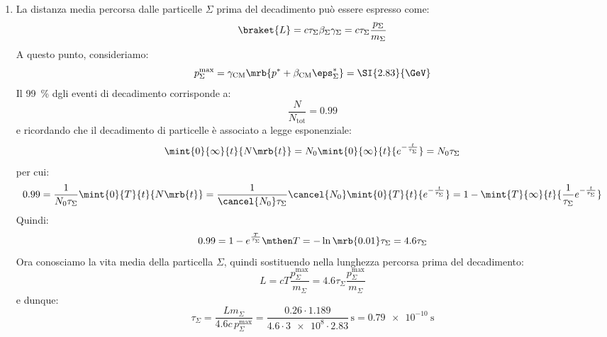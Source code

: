 \begin{example}[]
\begin{enumerate}
    \item La distanza media percorsa dalle particelle $\Sigma$ prima del
      decadimento può essere espresso come:
      \[
        \braket{L} = c \tau _{\Sigma} \beta _{\Sigma} \gamma _{\Sigma} = c \tau
        _{\Sigma} \frac{p _{\Sigma}}{m _{\Sigma}}
      \]
      A questo punto, consideriamo:
      \[
        p _{\Sigma}^\text{max} = \gamma _\text{CM} \mrb{p ^{\ast} + \beta
        _\text{CM} \eps _{\Sigma}^{\ast}} = \SI{2.83}{\GeV}
      \]
      Il \SI{99}{\%} dgli eventi di decadimento corrisponde a:
      \[
        \frac{N}{N _\text{tot}} = 0.99
      \]
      e ricordando che il decadimento di particelle è associato a legge
      esponenziale:
      \[
        \mint{0}{\infty}{t}{N \mrb{t}} = N _{0} \mint{0}{\infty}{t}{e^{-
        \frac{t}{\tau _{\Sigma}}}} = N _{0} \tau _{\Sigma}
      \]
      per cui:
      \[
        0.99 = \frac{1}{N _{0} \tau _{\Sigma}} \mint{0}{T}{t}{N \mrb{t}} =
        \frac{1}{\cancel{N_0} \tau _{\Sigma}} \cancel{N_0} \mint{0}{T}{t}{e^{-
        \frac{t}{\tau _{\Sigma}}}} = 1 - \mint{T}{\infty}{t}{\frac{1}{\tau
        _{\Sigma}} e^{- \frac{t}{\tau _{\Sigma}}}}
      \]
      Quindi:
      \[
        0.99 = 1 - e^{\frac{T}{\tau _{\Sigma}}}
        \mthen
        T = - \ln \mrb{0.01} \tau _{\Sigma} = 4.6 \tau _{\Sigma}
      \]
      Ora conosciamo la vita media della particella $\Sigma$, quindi
      sostituendo nella lunghezza percorsa prima del decadimento:
      \[
        L = c T \frac{p _{\Sigma}^\text{max}}{m _{\Sigma}} = 4.6 \tau
        _{\Sigma} \frac{p _{\Sigma}^\text{max}}{m _{\Sigma}}
      \]
      e dunque:
      \[
        \tau _{\Sigma} = \frac{L m_{\Sigma}}{4.6 c\, p _{\Sigma}^\text{max}}
        = \frac{0.26 \cdot 1.189}{4.6 \cdot \SI{3e8} \cdot 2.83}\,
        \si{\s} = \SI{0.79e-10}{\s}
      \]
  \end{enumerate}
\end{example}

